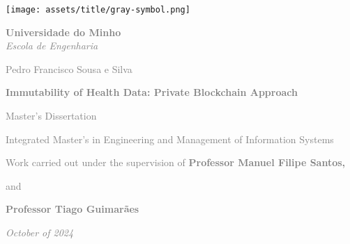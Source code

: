 \begin{titlepage}
\begin{center}

    \begin{minipage}{0.3\textwidth}
        \centering
        \texttt{[image: assets/title/gray-symbol.png]} 
        
        \vspace{0.5cm}

        \raggedright
        \textcolor{gray}{\textbf{Universidade do Minho}}\\
        \textcolor{gray}{\textit{Escola de Engenharia}} 

        \vspace{3cm}
        \begin{adjustwidth}{0cm}{-2cm}
        \textcolor{gray}{Pedro Francisco Sousa e Silva}
        \end{adjustwidth}
        
        \vspace{0.5cm}
        \begin{adjustwidth}{0cm}{-2cm}
        \textcolor{gray}{\textbf{Immutability of Health Data: Private Blockchain Approach}}
        \end{adjustwidth}
        
        \vspace{4cm}
        \begin{adjustwidth}{0cm}{-2cm}
        \textcolor{gray}{Master's Dissertation}
        \end{adjustwidth}
        
        \begin{adjustwidth}{0cm}{-2cm}
        \textcolor{gray}{Integrated Master's in Engineering and Management of Information Systems}
        \end{adjustwidth}
        \vspace{2cm}
        \begin{adjustwidth}{0cm}{-2cm}
        \textcolor{gray}{Work carried out under the supervision of
        \textbf{Professor Manuel Filipe Santos,}}
        \end{adjustwidth}
        
        \textcolor{gray}{and}
        
        \textcolor{gray}{\textbf{Professor Tiago Guimarães}}
        
    \end{minipage}
    \vfill
    \textcolor{gray}{\textit{October of 2024}} 
\end{center}
\end{titlepage}  
